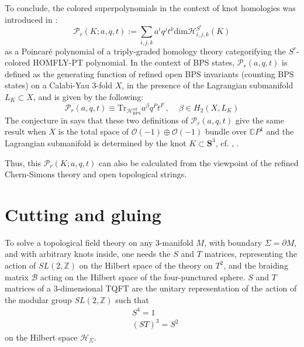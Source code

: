 \documentclass[a4paper,titlepage,twoside]{book}
\begin{document}
To conclude, the colored superpolynomials in the context of knot homologies was introduced in \cite{GukovStosic2012}:
\begin{equation}
\mathcal{P}_r{ (K;a,q,t) } := \sum_{ i,j,k} a^i q^j t^k \text{dim}{ \mathcal{H}_{i,j,k}^{ S^{r} }{ (K) } }
\end{equation}
as a Poincar\'e polynomial of a triply-graded homology theory categorifying the $S^r$-colored HOMFLY-PT polynomial.  In the context of BPS states, $\mathcal{P}_r{(a,q,t)}$ is defined as the generating function of refined open BPS invariants (counting BPS states) on a Calabi-Yau 3-fold $X$, in the presence of the Lagrangian submanifold $L_K \subset X$, and is given by the following:
\begin{equation}
  \mathcal{P}_r{(a,q,t)} \equiv \text{Tr}_{\mathcal{H}^{\text{ref}}_{\text{BPS}} }{ a^{\beta} q^P t^F } \, , \quad \, \beta \in H_2{(X,L_K)}
\end{equation}
The conjecture in \cite{GukovSchwarzVafa2005} says that these two definitions of $\mathcal{P}_r{(a,q,t)}$ give the same result when $X$ is the total space of $\mathcal{O}{(-1)} \oplus \mathcal{O}{(-1)}$ bundle over $\mathbb{C}P^1$ and the Lagrangian submanifold is determined by the knot $K\subset \mathbf{S}^3$, cf. \cite{Taubes2001}, \cite{bib:OV2000}.  

Thus, this $\mathcal{P}_r{ (K;a,q,t)}$ can also be calculated from the viewpoint of the refined Chern-Simons theory and open topological strings.




\section{Cutting and gluing}

To solve a topological field theory on any 3-manifold $M$, with boundary $\Sigma = \partial M$, and with arbitrary knots inside, one needs the $S$ and $T$ matrices, representing the action of $SL(2,\mathbb{Z})$ on the Hilbert space of the theory on $T^2$, and the braiding matrix $\mathcal{B}$ acting on the Hilbert space of the four-punctured sphere.  $S$ and $T$ matrices of a 3-dimensional TQFT are the unitary representation of the action of the modular group $SL{(2,\mathbb{Z})}$ such that 
\begin{equation}
  \begin{aligned}
    & S^4 =1 \\
    & (ST)^3 = S^2
\end{aligned}
\end{equation}
on the Hilbert space $\mathcal{H}_{\Sigma}$.  
\end{document}
